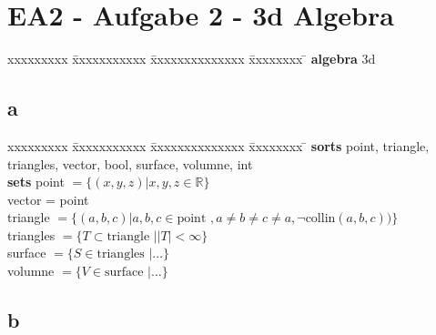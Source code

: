 \documentclass[12pt]{article}
\newcommand{\R}{\mathbb{R}}
\begin{document}
\newpage
\section*{EA2 - Aufgabe 2 - 3d Algebra}
\begin{tabbing}
xxxxxxxxx \= xxxxxxxxxxx \= xxxxxxxxxxxxxx \= xxxxxxxx \= \kill
\textbf{algebra} \> 3d \\
\end{tabbing}

\subsection*{a}
\begin{tabbing}
xxxxxxxxx \= xxxxxxxxxxx \= xxxxxxxxxxxxxx \= xxxxxxxx \= \kill
\textbf{sorts}  \> point, triangle, triangles, vector, bool, surface, volumne, int \\
\textbf{sets}   \> point    \> $= \{(x,y,z)|x,y,z \in \R \}$ \\
                \> vector   \> = point \\
                \> triangle \> $= \{(a, b, c)|a,b,c \in \text{point }, a \not= b \not= c \not= a, \neg \text{collin}(a,b,c))   \}$\\
                \> triangles \> $= \{ T\subset \text{triangle }||T| < \infty \}$ \\
                \> surface  \> $= \{S \in \text{triangles }| \dots  \}$ \\
                \> volumne  \> $= \{V \in \text{surface }| \dots \} $
\end{tabbing}

\subsection*{b}
\end{document}
